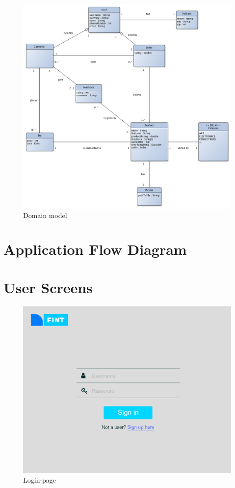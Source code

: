 \begin{figure}[H]
  \caption{Domain model}
  \centering
    \includegraphics[scale=0.38]{figures/domain-diagram.png}
\end{figure}

\section{Application Flow Diagram}

\section{User Screens	}
\begin{figure}[H]
  \caption{Login-page}
  \centering
    \includegraphics[scale=0.38]{figures/Login}
\end{figure}

